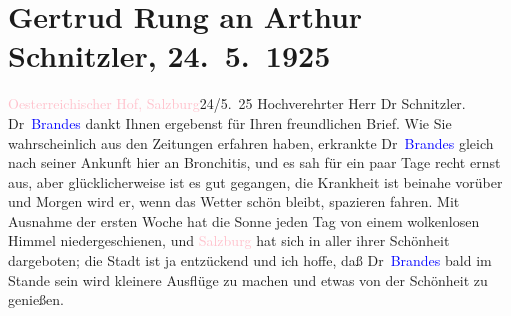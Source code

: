 

               \section[Gertrud Rung an Arthur Schnitzler, 24. 5. 1925]{ Gertrud Rung an Arthur Schnitzler, 24. 5. 1925}\nopagebreak{}\rehead{ }\normalsize\beginnumbering{} \toendnotes[C]{\smallbreak\pagebreak[2]} 
\pstart
           \raggedleft{}{\pb}\textcolor{pink}{Oesterreichischer Hof, Salzburg}{}\ledrightnote{\textcolor{pink}{Österreichischer Hof}}{\\}24/5. 25\pend
           \pstart{}Hochverehrter Herr Dr Schnitzler.\pend\pstart
           Dr \textcolor{blue}{Brandes}{}\ledrightnote{\textcolor{blue}{Georg Brandes}} dankt Ihnen ergebenst für Ihren
                    freundlichen Brief. Wie Sie wahrscheinlich aus den Zeitungen erfahren haben,
                    erkrankte Dr \textcolor{blue}{Brandes}{}\ledrightnote{\textcolor{blue}{Georg Brandes}} gleich nach seiner
                    Ankunft hier an Bronchitis, und es sah für ein paar Tage recht ernst aus, aber
                    glücklicherweise ist es gut gegangen, die Krankheit ist beinahe vorüber und
                    Morgen {\pb}wird er, wenn das
                    Wetter schön bleibt, spazieren fahren.\pend
           \pstart
           Mit Ausnahme der ersten Woche hat die Sonne jeden Tag von einem wolkenlosen
                    Himmel niedergeschienen, und \textcolor{pink}{Salzburg}{}\ledrightnote{\textcolor{pink}{Salzburg}} hat sich
                    in aller ihrer Schönheit dargeboten; die Stadt ist ja entzückend und ich hoffe,
                    daß Dr \textcolor{blue}{Brandes}{}\ledrightnote{\textcolor{blue}{Georg Brandes}} bald im Stande sein wird
                    kleinere Ausflüge zu machen und etwas von der Schönheit zu genießen.\pend
